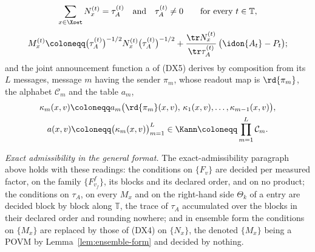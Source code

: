 \begin{definition}
\begin{equation}
  \sum_{x\in\Xset}N^{(t)}_x=\tau^{(t)}_A
  \quad\text{and}\quad\tau^{(t)}_A\ne0
  \qquad\text{for every }t\in\mathbb{T},
\end{equation}
\begin{equation}\label{eq:ensemblepovm}
  M^{(t)}_x\coloneqq\big(\tau^{(t)}_A\big)^{-1/2}N^{(t)}_x
  \big(\tau^{(t)}_A\big)^{-1/2}
  +\frac{\tr N^{(t)}_x}{\tr\tau^{(t)}_A}\,\big(\idon{A_t}-P_t\big);
\end{equation}
and the joint announcement function a  of (DX5)
derives by composition from its $L$ messages, message $m$ having the sender
$\pi_m$, whose readout map is $\rd{\pi_m}$, the alphabet $\mathcal{C}_m$ and
the table $a_m$,
\begin{equation}\label{eq:transcript}
\begin{gathered}
  \kappa_m(x,v)\coloneqq a_m\big(\rd{\pi_m}(x,v),\,\kappa_1(x,v),\dots,
  \kappa_{m-1}(x,v)\big),\\
  a(x,v)\coloneqq\big(\kappa_m(x,v)\big)_{m=1}^{L}\in
  \Kann\coloneqq\prod_{m=1}^{L}\mathcal{C}_m .
\end{gathered}
\end{equation}

\emph{Exact admissibility in the general format.} The exact-admissibility
paragraph above holds with these readings: the conditions on $\{F_v\}$ are
decided per measured factor, on the family $\{F^{f}_{v_f}\}$, its blocks and
its declared order, and on no product; the conditions on $\tau_A$, on every
$M_x$ and on the right-hand side $\Theta_k$ of a  entry are
decided block by block along $\mathbb{T}$, the trace of $\tau_A$
accumulated over the blocks in their declared order and rounding nowhere;
and in ensemble form the conditions on $\{M_x\}$ are replaced by those of
(DX4) on $\{N_x\}$, the denoted $\{M_x\}$ being a POVM by
Lemma~\ref{lem:ensemble-form} and decided by nothing.
\end{definition}
